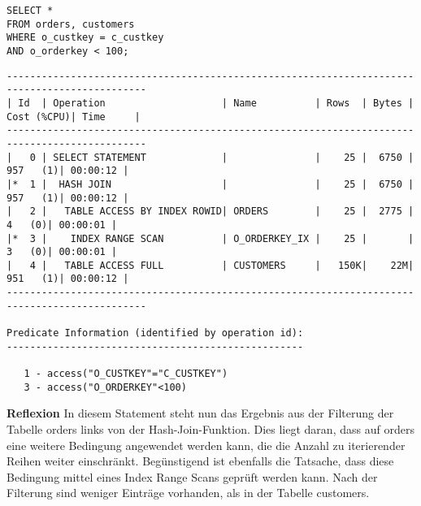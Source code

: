 \documentclass[10pt]{article}
\begin{document}
\begin{lstlisting}[style=sql]
SELECT *
FROM orders, customers
WHERE o_custkey = c_custkey
AND o_orderkey < 100;
\end{lstlisting}
\begin{lstlisting}[style=queryexecutionplan]
----------------------------------------------------------------------------------------------
| Id  | Operation                    | Name          | Rows  | Bytes | Cost (%CPU)| Time     |
----------------------------------------------------------------------------------------------
|   0 | SELECT STATEMENT             |               |    25 |  6750 |   957   (1)| 00:00:12 |
|*  1 |  HASH JOIN                   |               |    25 |  6750 |   957   (1)| 00:00:12 |
|   2 |   TABLE ACCESS BY INDEX ROWID| ORDERS        |    25 |  2775 |     4   (0)| 00:00:01 |
|*  3 |    INDEX RANGE SCAN          | O_ORDERKEY_IX |    25 |       |     3   (0)| 00:00:01 |
|   4 |   TABLE ACCESS FULL          | CUSTOMERS     |   150K|    22M|   951   (1)| 00:00:12 |
----------------------------------------------------------------------------------------------
 
Predicate Information (identified by operation id):
---------------------------------------------------
 
   1 - access("O_CUSTKEY"="C_CUSTKEY")
   3 - access("O_ORDERKEY"<100)
\end{lstlisting}
\textbf{Reflexion} \newline
In diesem Statement steht nun das Ergebnis aus der Filterung der Tabelle orders links von der Hash-Join-Funktion.
Dies liegt daran, dass auf orders eine weitere Bedingung angewendet werden kann, die die Anzahl zu iterierender Reihen weiter einschränkt. Begünstigend ist ebenfalls die Tatsache, dass diese Bedingung mittel eines Index Range Scans geprüft werden kann.
Nach der Filterung sind weniger Einträge vorhanden, als in der Tabelle customers.
\end{document}
